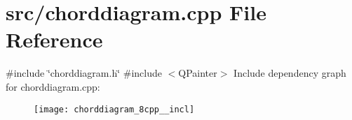 \section{src/chorddiagram.cpp File Reference}
\label{chorddiagram_8cpp}
{\ttfamily \#include \char`\"{}chorddiagram.\+h\char`\"{}}\newline
{\ttfamily \#include $<$Q\+Painter$>$}\newline
Include dependency graph for chorddiagram.\+cpp\+:\nopagebreak
\begin{figure}[H]
\begin{center}
\leavevmode
\texttt{[image: chorddiagram\_8cpp\_\_incl]}
\end{center}
\end{figure}
